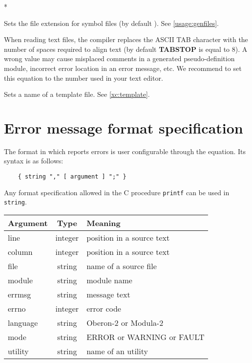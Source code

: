 \begin{description}
        \MLBegin{}*\MLEnd{}

        Sets the file extension for symbol files
        (by default {\bf \Sym}). See \ref{usage:genfiles}.

        \MLBegin{}\ModeG{}\MLEnd{}

        When reading text files, the compiler replaces the ASCII TAB character
        with the number of spaces required to align text (by default {\bf
        TABSTOP} is equal to 8). A wrong value may cause misplaced
        comments in a generated pseudo-definition module, incorrect
        error location in an error message, etc.  We recommend
        to set this equation to the number used in your text editor.

        \MLBegin{}\ModeG{}\MLEnd{}

        Sets a name of a template file. See \ref{xc:template}.

\ifonline \else
\end{description}
\fi

\section{Error message format specification}\label{opt:errfmt}

The format in which \xds{} reports errors is user configurable through
the  equation. Its syntax is as follows:

\verb'    { string "," [ argument ] ";" }'

Any format specification allowed in the C procedure \verb'printf' can be
used in {\tt string}.

\begin{tabular}{lcl}
\bf Argument &\bf Type &\bf Meaning \\
\hline
line         & integer  &  position in a source text   \\
column       & integer  &  position in a source text   \\
file         & string   &  name of a source file       \\
module       & string   &  module name                 \\
errmsg       & string   &  message text                \\
errno        & integer  &  error code                  \\
language     & string   &  Oberon-2 or Modula-2        \\
mode         & string   &  ERROR or WARNING or FAULT   \\
utility      & string   &  name of an utility          \\
\end{tabular}

